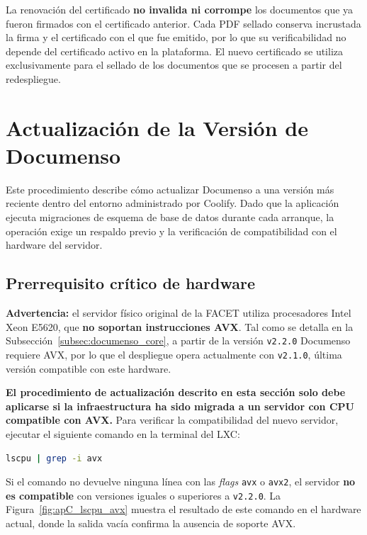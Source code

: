 La renovación del certificado \textbf{no invalida ni corrompe} los documentos que ya fueron firmados con el certificado anterior. Cada PDF sellado conserva incrustada la firma y el certificado con el que fue emitido, por lo que su verificabilidad no depende del certificado activo en la plataforma. El nuevo certificado se utiliza exclusivamente para el sellado de los documentos que se procesen a partir del redespliegue.


\section{Actualización de la Versión de Documenso}
\label{AppendixC:ActualizacionVersion}

Este procedimiento describe cómo actualizar Documenso a una versión más reciente dentro del entorno administrado por Coolify. Dado que la aplicación ejecuta migraciones de esquema de base de datos durante cada arranque, la operación exige un respaldo previo y la verificación de compatibilidad con el hardware del servidor.

\subsection{Prerrequisito crítico de hardware}

\textbf{Advertencia:} el servidor físico original de la FACET utiliza procesadores Intel Xeon E5620, que \textbf{no soportan instrucciones AVX}. Tal como se detalla en la Subsección~\ref{subsec:documenso_core}, a partir de la versión \texttt{v2.2.0} Documenso requiere AVX, por lo que el despliegue opera actualmente con \texttt{v2.1.0}, última versión compatible con este hardware.

\textbf{El procedimiento de actualización descrito en esta sección solo debe aplicarse si la infraestructura ha sido migrada a un servidor con CPU compatible con AVX.} Para verificar la compatibilidad del nuevo servidor, ejecutar el siguiente comando en la terminal del LXC:

\begin{lstlisting}[language=bash, caption={Verificación de soporte AVX en el procesador del servidor}, label={lst:apC_check_avx}]
lscpu | grep -i avx
\end{lstlisting}

Si el comando no devuelve ninguna línea con las \textit{flags} \texttt{avx} o \texttt{avx2}, el servidor \textbf{no es compatible} con versiones iguales o superiores a \texttt{v2.2.0}. La Figura~\ref{fig:apC_lscpu_avx} muestra el resultado de este comando en el hardware actual, donde la salida vacía confirma la ausencia de soporte AVX.


